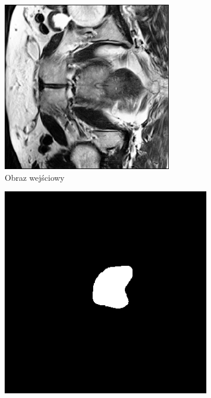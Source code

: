 \documentclass[a4paper,11pt,twoside]{report}
\theoremstyle{definition}
\begin{document}
\begin{figure}[htb]
	\medskip
	\begin{subfigure}{0.25\textwidth}
		\includegraphics[width=\linewidth]{segmentation/segmentation_train_2.png}
		\caption{Obraz wejściowy}
		\label{fig:4}
	\end{subfigure}\hfil %
	\begin{subfigure}{0.25\textwidth}
		\includegraphics[width=\linewidth]{segmentation/pred_mask_2.png}

\end{subfigure}
\end{figure}
\end{document}

